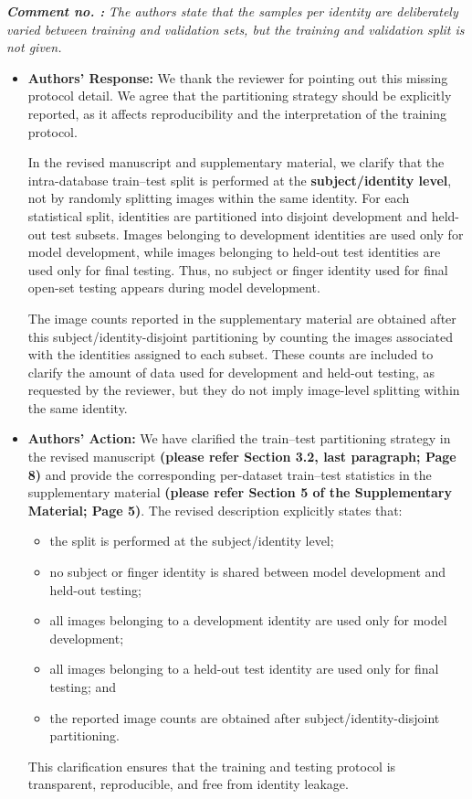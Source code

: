 \documentclass[11pt]{article}
\theoremstyle{remark}
\newcounter{mycounter} %
\newcommand\showReviewcounter{\stepcounter{mycounter}\themycounter}
\begin{document}
\color{blue} 
\textbf{\textit{Comment no. \showReviewcounter:}} 
\textit{The authors state that the samples per identity are deliberately varied between training and validation sets, but the training and validation split is not given.}
\color{black}

\begin{itemize}
	\item \textbf{Authors' Response:} 
	We thank the reviewer for pointing out this missing protocol detail. We agree that the partitioning strategy should be explicitly reported, as it affects reproducibility and the interpretation of the training protocol.

	In the revised manuscript and supplementary material, we clarify that the intra-database train--test split is performed at the \textbf{subject/identity level}, not by randomly splitting images within the same identity. For each statistical split, identities are partitioned into disjoint development and held-out test subsets. Images belonging to development identities are used only for model development, while images belonging to held-out test identities are used only for final testing. Thus, no subject or finger identity used for final open-set testing appears during model development.

	The image counts reported in the supplementary material are obtained after this subject/identity-disjoint partitioning by counting the images associated with the identities assigned to each subset. These counts are included to clarify the amount of data used for development and held-out testing, as requested by the reviewer, but they do not imply image-level splitting within the same identity.

	\item \textbf{Authors' Action:} 
	We have clarified the train--test partitioning strategy in the revised manuscript \textbf{(please refer Section 3.2, last paragraph; Page 8)} and provide the corresponding per-dataset train--test statistics in the supplementary material \textbf{(please refer Section 5 of the Supplementary Material; Page 5)}. The revised description explicitly states that:
	\begin{itemize}
		\item the split is performed at the subject/identity level;
		\item no subject or finger identity is shared between model development and held-out testing;
		\item all images belonging to a development identity are used only for model development;
		\item all images belonging to a held-out test identity are used only for final testing; and
		\item the reported image counts are obtained after subject/identity-disjoint partitioning.
	\end{itemize}

	This clarification ensures that the training and testing protocol is transparent, reproducible, and free from identity leakage.
\end{itemize}
\end{document}
